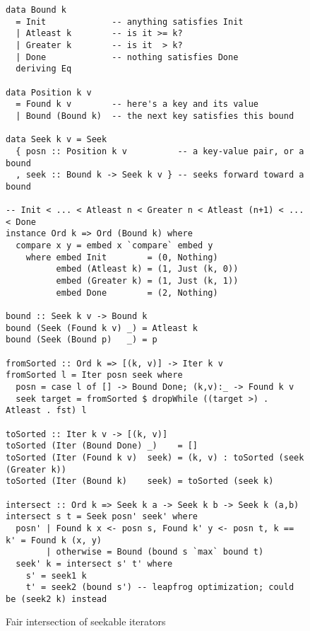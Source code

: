 \documentclass[acmsmall,screen,review,anonymous,dvipsnames,svgnames]{acmart}
\begin{document}
\begin{figure}
  \begin{verbatim}
data Bound k
  = Init             -- anything satisfies Init
  | Atleast k        -- is it >= k?
  | Greater k        -- is it  > k?
  | Done             -- nothing satisfies Done
  deriving Eq

data Position k v
  = Found k v        -- here's a key and its value
  | Bound (Bound k)  -- the next key satisfies this bound

data Seek k v = Seek
  { posn :: Position k v          -- a key-value pair, or a bound
  , seek :: Bound k -> Seek k v } -- seeks forward toward a bound

-- Init < ... < Atleast n < Greater n < Atleast (n+1) < ... < Done
instance Ord k => Ord (Bound k) where
  compare x y = embed x `compare` embed y
    where embed Init        = (0, Nothing)
          embed (Atleast k) = (1, Just (k, 0))
          embed (Greater k) = (1, Just (k, 1))
          embed Done        = (2, Nothing)

bound :: Seek k v -> Bound k
bound (Seek (Found k v) _) = Atleast k
bound (Seek (Bound p)   _) = p

fromSorted :: Ord k => [(k, v)] -> Iter k v
fromSorted l = Iter posn seek where
  posn = case l of [] -> Bound Done; (k,v):_ -> Found k v
  seek target = fromSorted $ dropWhile ((target >) . Atleast . fst) l

toSorted :: Iter k v -> [(k, v)]
toSorted (Iter (Bound Done) _)    = []
toSorted (Iter (Found k v)  seek) = (k, v) : toSorted (seek (Greater k))
toSorted (Iter (Bound k)    seek) = toSorted (seek k)

intersect :: Ord k => Seek k a -> Seek k b -> Seek k (a,b)
intersect s t = Seek posn' seek' where
  posn' | Found k x <- posn s, Found k' y <- posn t, k == k' = Found k (x, y)
        | otherwise = Bound (bound s `max` bound t)
  seek' k = intersect s' t' where
    s' = seek1 k
    t' = seek2 (bound s') -- leapfrog optimization; could be (seek2 k) instead
  \end{verbatim}
  \caption{Fair intersection of seekable iterators}
  \label{fig:fair-iterators}
\end{figure}



\end{document}
